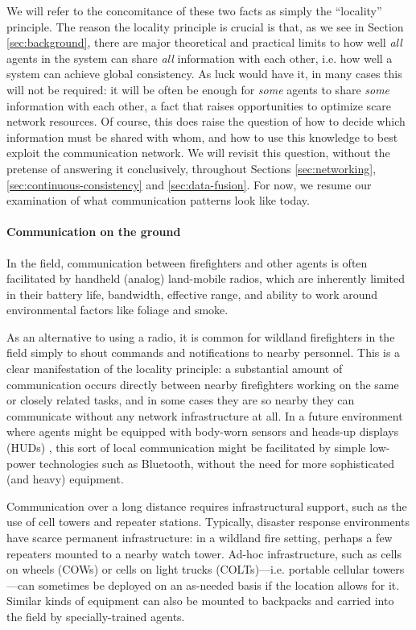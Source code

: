 \documentclass[]             %
{NASA}                       %
\theoremstyle{definition}
\begin{document}
We will refer to the concomitance of these two facts as simply the
``locality'' principle. The reason the locality principle is crucial
is that, as we see in Section \ref{sec:background}, there are major
theoretical and practical limits to how well \emph{all} agents in the
system can share \emph{all} information with each other, i.e. how well
a system can achieve global consistency. As luck would have it, in
many cases this will not be required: it will be often be enough for
\emph{some} agents to share \emph{some} information with each other, a
fact that raises opportunities to optimize scare network resources. Of
course, this does raise the question of how to decide which
information must be shared with whom, and how to use this knowledge to
best exploit the communication network. We will revisit this question,
without the pretense of answering it conclusively, throughout Sections
\ref{sec:networking}, \ref{sec:continuous-consistency} and
\ref{sec:data-fusion}. For now, we resume our examination of what
communication patterns look like today.

\paragraph{Communication on the ground}
In the field, communication between firefighters and other agents is
often facilitated by handheld (analog) land-mobile radios, which are
inherently limited in their battery life, bandwidth, effective range,
and ability to work around environmental factors like foliage and
smoke.

As an alternative to using a radio, it is common for wildland
firefighters in the field simply to shout commands and notifications
to nearby personnel. This is a clear manifestation of the locality
principle: a substantial amount of communication occurs directly
between nearby firefighters working on the same or closely related
tasks, and in some cases they are so nearby they can communicate
without any network infrastructure at all. In a future environment
where agents might be equipped with body-worn sensors and heads-up
displays (HUDs) \citationneeded, this sort of local communication
might be facilitated by simple low-power technologies such as
Bluetooth, without the need for more sophisticated (and heavy)
equipment.

Communication over a long distance requires infrastructural support,
such as the use of cell towers and repeater stations. Typically,
disaster response environments have scarce permanent infrastructure:
in a wildland fire setting, perhaps a few repeaters mounted to a
nearby watch tower. Ad-hoc infrastructure, such as cells on wheels
(COWs) or cells on light trucks (COLTs)---i.e. portable cellular towers---can sometimes be deployed on an as-needed basis if the location
allows for it. Similar kinds of equipment can also be mounted to backpacks and carried into the field by specially-trained agents.
\end{document}
